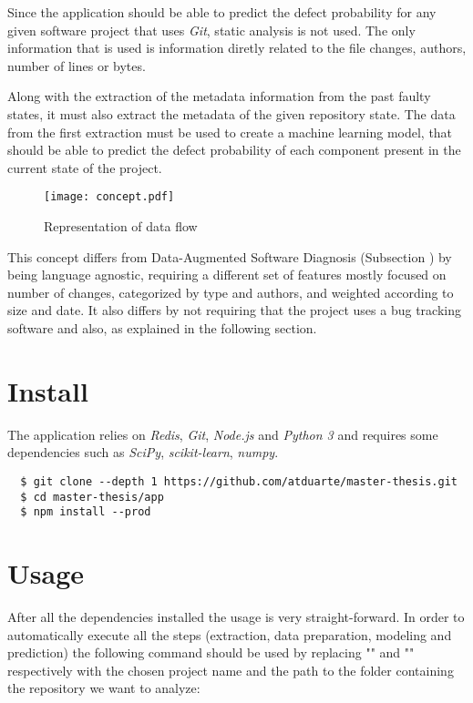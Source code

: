 Since the application should be able to predict the defect probability for any given software project that uses \emph{Git}, static analysis is not used. 
The only information that is used is information diretly related to the file changes, authors, number of lines or bytes.

Along with the extraction of the metadata information from the past faulty states, it must also extract the metadata of the given repository state. The data from the first extraction must be used to create a machine learning model, that should be able to predict the defect probability of each component present in the current state of the project.
%
\begin{figure}[ht]
  \begin{center}
    \leavevmode
    \texttt{[image: concept.pdf]}
    \caption{Representation of data flow}
    \label{fig:concept}
  \end{center}
\end{figure}

This concept differs from Data-Augmented Software Diagnosis (Subsection \label{subsec:elmishali}) by being language agnostic, requiring a different set of features mostly focused on number of changes, categorized by type and authors, and weighted according to size and date. It also differs by not requiring that the project uses a bug tracking software and also, as explained in the following section. 

\section{Install}

The application relies on \emph{Redis}, \emph{Git}, \emph{Node.js} and \emph{Python 3} and requires some dependencies such as \emph{SciPy}, \emph{scikit-learn}, \emph{numpy}.

\begin{lstlisting}
  $ git clone --depth 1 https://github.com/atduarte/master-thesis.git
  $ cd master-thesis/app
  $ npm install --prod
\end{lstlisting}

\section{Usage}

After all the dependencies installed the usage is very straight-forward.
In order to automatically execute all the steps (extraction, data preparation, modeling and prediction) the following command should be used
by replacing "" and "" respectively with
the chosen project name and the path to the folder containing the repository we want to analyze:

